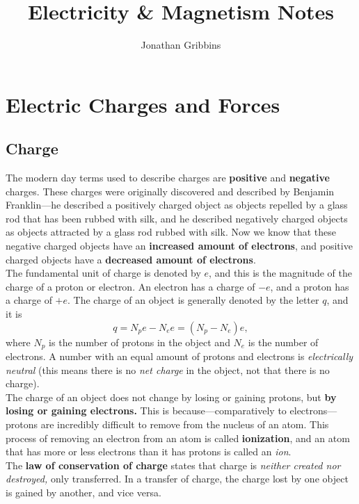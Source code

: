 \documentclass[12pt,letterpaper]{article}
\author{Jonathan Gribbins}
\title{Electricity \& Magnetism Notes}
\date{}
\begin{document}
\maketitle

\tableofcontents

\pagebreak

\section{Electric Charges and Forces}

\subsection{Charge}

The modern day terms used to describe charges are \textbf{positive} and \textbf{negative} charges. These charges were originally discovered and described by Benjamin Franklin---he described a positively charged object as objects repelled by a glass rod that has been rubbed with silk, and he described negatively charged objects as objects attracted by a glass rod rubbed with silk. Now we know that these negative charged objects have an \textbf{increased amount of electrons}, and positive charged objects have a \textbf{decreased amount of electrons}. \\

The fundamental unit of charge is denoted by $e$, and this is the magnitude of the charge of a proton or electron. An electron has a charge of $-e$, and a proton has a charge of $+e$. The charge of an object is generally denoted by the letter $q$, and it is $$q = N_{p}e - N_{e}e = \left(N_{p} - N_{e}\right)e,$$ where $N_{p}$ is the number of protons in the object and $N_{e}$ is the number of electrons. A number with an equal amount of protons and electrons is \textit{electrically neutral} (this means there is no \textit{net charge} in the object, not that there is no charge). \\

The charge of an object does not change by losing or gaining protons, but \textbf{by losing or gaining electrons.} This is because---comparatively to electrons---protons are incredibly difficult to remove from the nucleus of an atom. This process of removing an electron from an atom is called \textbf{ionization}, and an atom that has more or less electrons than it has protons is called an \textit{ion}. \\

The \textbf{law of conservation of charge} states that charge is \textit{neither created nor destroyed,} only transferred. In a transfer of charge, the charge lost by one object is gained by another, and vice versa. 
\end{document}
